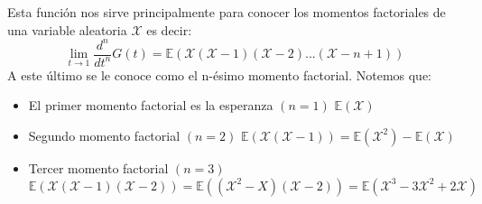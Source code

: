 Esta función nos sirve principalmente para conocer los momentos factoriales de una variable aleatoria $\mathcal X$ es decir:
  \[
  \lim_{t \to 1} \frac{d^n}{dt^n}G(t) = \mathbb E(\mathcal X(\mathcal X-1)(\mathcal X-2)...(\mathcal X-n+1))
\]
A este último se le conoce como el n-ésimo momento factorial. Notemos que:
\begin{itemize}
    \item El primer momento factorial es la esperanza $(n=1)$ $\mathbb E(\mathcal X)$
    \item Segundo momento factorial $(n=2)$ $\mathbb{E}(\mathcal X(\mathcal X-1))=\mathbb{E}(\mathcal X^2)-\mathbb{E}(\mathcal X)$
    \item Tercer momento factorial $(n=3)$ $\mathbb{E}(\mathcal X(\mathcal X-1)(\mathcal X-2))=\mathbb{E}((\mathcal X^2-X)(\mathcal X-2))=\mathbb{E}(\mathcal X^3-3\mathcal X^2+2\mathcal X)$
\end{itemize}

